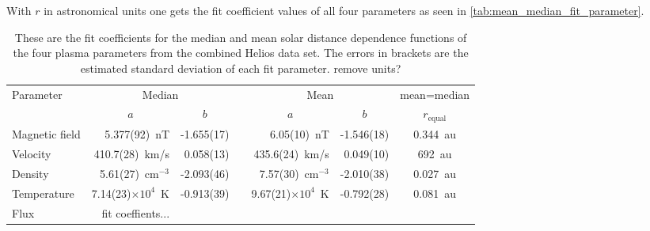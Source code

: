 With $r$ in astronomical units one gets the fit coefficient values of all four parameters as seen in \autoref{tab:mean_median_fit_parameter}.
\begin{table}[htb]\small
	\centering
	\captionsetup{belowskip=4pt}
	\caption{These are the fit coefficients for the median and mean solar distance dependence functions of the four plasma parameters from the combined Helios data set. The errors in brackets are the estimated standard deviation of each fit parameter. remove units?}
	\begin{tabular}{lrrcrrc}
		\toprule
		\multirow{2}{*}{Parameter}	&\multicolumn{2}{c}{Median}	&	&\multicolumn{2}{c}{Mean}	&mean=median\\
		\cmidrule{2-3}	\cmidrule{5-6}
			&\multicolumn{1}{c}{$a$}	&\multicolumn{1}{c}{$b$}	&	&\multicolumn{1}{c}{$a$}	&\multicolumn{1}{c}{$b$}	&$r_\text{equal}$\\
		\midrule
		Magnetic field	&5.377(92)~nT	&-1.655(17)	&	&6.05(10)~nT		&-1.546(18)	&0.344~au\\
		Velocity	&410.7(28)~km/s	&0.058(13)	&	&435.6(24)~km/s	&0.049(10)	&692~au\\
		Density		&5.61(27)~cm$^{-3}$	&-2.093(46)	&	&7.57(30)~cm$^{-3}$	&-2.010(38)	&0.027~au\\
		Temperature	&7.14(23)$ \times 10^4$~K	&-0.913(39)	&	&9.67(21)$ \times 10^4$~K	&-0.792(28)	&0.081~au\\
		Flux		&fit coeffients...\\
		\bottomrule
	\end{tabular}
	\label{tab:mean_median_fit_parameter}
\end{table}

